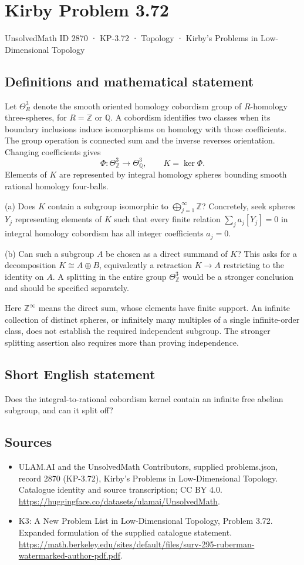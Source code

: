 \documentclass[11pt,a4paper]{article}
\begin{document}
\section*{Kirby Problem 3.72}\label{2870}
{\small UnsolvedMath ID 2870 · KP-3.72 · Topology · Kirby's Problems in Low-Dimensional Topology}
\subsection{Definitions and mathematical statement}
Let $\Theta^3_R$ denote the smooth oriented homology cobordism group of $R$-homology three-spheres, for $R=\mathbb Z$ or $\mathbb Q$. A cobordism identifies two classes when its boundary inclusions induce isomorphisms on homology with those coefficients. The group operation is connected sum and the inverse reverses orientation. Changing coefficients gives
\[
\Phi:\Theta^3_{\mathbb Z}\longrightarrow\Theta^3_{\mathbb Q},
\qquad K=\ker\Phi.
\]
Elements of $K$ are represented by integral homology spheres bounding smooth rational homology four-balls.

(a) Does $K$ contain a subgroup isomorphic to $\bigoplus_{j=1}^{\infty}\mathbb Z$? Concretely, seek spheres $Y_j$ representing elements of $K$ such that every finite relation $\sum_j a_j[Y_j]=0$ in integral homology cobordism has all integer coefficients $a_j=0$.

(b) Can such a subgroup $A$ be chosen as a direct summand of $K$? This asks for a decomposition $K\cong A\oplus B$, equivalently a retraction $K\to A$ restricting to the identity on $A$. A splitting in the entire group $\Theta^3_{\mathbb Z}$ would be a stronger conclusion and should be specified separately.

Here $\mathbb Z^\infty$ means the direct sum, whose elements have finite support. An infinite collection of distinct spheres, or infinitely many multiples of a single infinite-order class, does not establish the required independent subgroup. The stronger splitting assertion also requires more than proving independence.
\subsection{Short English statement}
Does the integral-to-rational cobordism kernel contain an infinite free abelian subgroup, and can it split off?
\subsection{Sources}
\begin{itemize}
\item[S1] ULAM.AI and the UnsolvedMath Contributors, supplied problems.json, record 2870 (KP-3.72), Kirby's Problems in Low-Dimensional Topology. Catalogue identity and source transcription; CC BY 4.0.
\url{https://huggingface.co/datasets/ulamai/UnsolvedMath}.
\item[S2] K3: A New Problem List in Low-Dimensional Topology, Problem 3.72. Expanded formulation of the supplied catalogue statement.
\url{https://math.berkeley.edu/sites/default/files/surv-295-ruberman-watermarked-author-pdf.pdf}.
\end{itemize}
\end{document}
